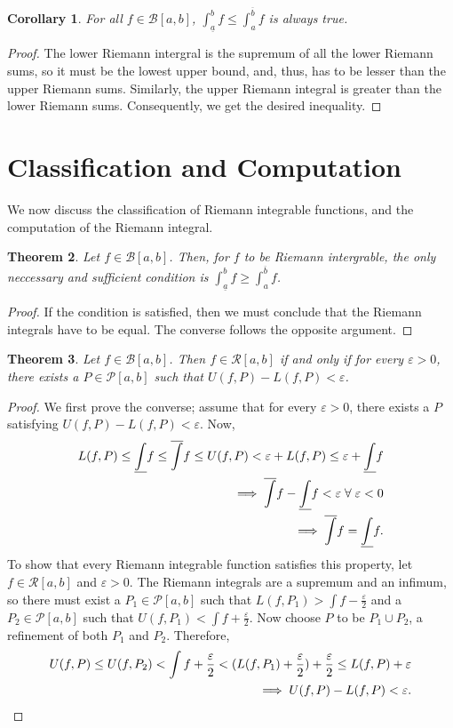\documentclass[15pt,a4paper]{book}
\newtheorem{theorem}{Theorem}[chapter]
\newtheorem{corollary}[theorem]{Corollary}
\theoremstyle{definition}
\newcommand{\cP}{\mathcal{P}}
\newcommand{\cR}{\mathcal{R}}
\newcommand{\cB}{\mathcal{B}}
\begin{document}
\begin{corollary}
    For all $f \in \cB [a,b]$, $\int_{\underline{a}}^{b} f \leq \int_{a}^{\overline{b}} f$ is always true.
\end{corollary}
\begin{proof}
    The lower Riemann intergral is the supremum of all the lower Riemann sums, so it must be the lowest upper bound, and, thus, has to be lesser than the upper Riemann sums. Similarly, the upper Riemann integral is greater than the lower Riemann sums. Consequently, we get the desired inequality.
\end{proof}
\section{Classification and Computation}
We now discuss the classification of Riemann integrable functions, and the computation of the Riemann integral.
\begin{theorem}
    Let $f \in \cB [a,b]$. Then, for $f$ to be Riemann intergrable, the only neccessary and sufficient condition is $\int_{\underline{a}}^{b} f \geq \int_{a}^{\overline{b}} f$.
\end{theorem}
\begin{proof}
    If the condition is satisfied, then we must conclude that the Riemann integrals have to be equal. The converse follows the opposite argument.
\end{proof}
\begin{theorem}
    Let $f \in \cB [a,b]$. Then $f \in \cR [a,b]$ if and only if for every $\varepsilon > 0$, there exists a $P \in \cP [a,b]$ such that $U(f,P) - L(f,P) < \varepsilon$.
\end{theorem}
\begin{proof}
    We first prove the converse; assume that for every $\varepsilon > 0$, there exists a $P$ satisfying $U(f,P) - L(f,P) < \varepsilon$. Now,
    \begin{align}
        L(f,P) \leq \underline{\int} f \leq \overline{\int} f \leq U(f,P) < \varepsilon + L(f,P) \leq \varepsilon + \underline{\int} f \notag \\
        \implies \overline{\int} f - \underline{\int} f < \varepsilon \; \forall \; \varepsilon < 0\\
        \implies \overline{\int} f = \underline{\int} f.
    \end{align}
    To show that every Riemann integrable function satisfies this property, let $f \in \cR [a,b]$ and $\varepsilon > 0$. The Riemann integrals are a supremum and an infimum, so there must exist a $P_{1} \in \cP [a,b]$ such that $L(f,P_{1}) > \int f - \frac{\varepsilon}{2}$ and a $P_{2} \in \cP [a,b]$ such that $U(f,P_{1}) < \int f + \frac{\varepsilon}{2}$. Now choose $P$ to be $P_{1} \cup P_{2}$, a refinement of both $P_{1}$ and $P_{2}$. Therefore,
    \begin{align}
        U(f,P) \leq U(f,P_{2}) < \int f + \frac{\varepsilon}{2} < (L(f,P_{1}) + \frac{\varepsilon}{2}) + \frac{\varepsilon}{2} \leq L(f,P) + \varepsilon \notag \\
        \implies U(f,P) - L(f,P) < \varepsilon.
    \end{align}
\end{proof}
\end{document}
